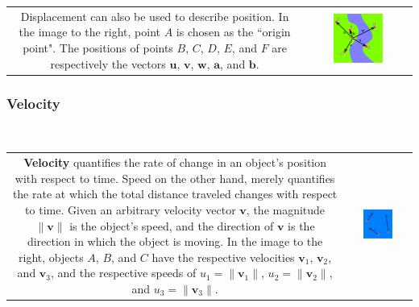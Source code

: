 \documentclass{article}
\begin{document}
\begin{tabular}{cc}
\parbox{0.5\textwidth}{
Displacement can also be used to describe position. In the image to the right, point \(A\) is chosen as the ``origin point". The positions of points \(B\), \(C\), \(D\), \(E\), and \(F\) are respectively the vectors \(\mathbf{u}\), \(\mathbf{v}\), \(\mathbf{w}\), \(\mathbf{a}\), and \(\mathbf{b}\). 
} & \parbox{0.5\textwidth}{
\includegraphics[width = 0.5\textwidth]{position}
}
\end{tabular}



\subsubsection*{Velocity}

~~

\begin{tabular}{cc}
\parbox{0.5\textwidth}{
{\bf Velocity} quantifies the rate of change in an object's position with respect to time. Speed on the other hand, merely quantifies the rate at which the total distance traveled changes with respect to time. Given an arbitrary velocity vector \(\mathbf{v}\), the magnitude \(\|\mathbf{v}\|\) is the object's speed, and the direction of \(\mathbf{v}\) is the direction in which the object is moving. In the image to the right, objects \(A\), \(B\), and \(C\) have the respective velocities \(\mathbf{v}_1\), \(\mathbf{v}_2\), and \(\mathbf{v}_3\), and the respective speeds of \(u_1 = \|\mathbf{v}_1\|\), \(u_2 = \|\mathbf{v}_2\|\), and \(u_3 = \|\mathbf{v}_3\|\).
} & \parbox{0.5\textwidth}{
\includegraphics[width = 0.5\textwidth]{velocity}
} 
\end{tabular}
\end{document}
